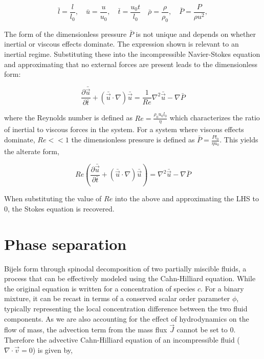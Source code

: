 \begin{equation}
    \bar{l} = \frac{l}{l_0}, \quad \bar{u} = \frac{u}{u_0}, \quad \bar{t} = \frac{u_0 t}{l_0} \quad \bar{\rho} = \frac{\rho}{\rho_0}, \quad \bar{P} = \frac{P}{\rho u^2}, 
\end{equation}

The form of the dimensionless pressure $\bar{P}$ is not unique and depends on whether inertial or viscous effects dominate. The expression shown is 
relevant to an inertial regime. Substituting these into the incompressible Navier-Stokes equation and approximating that no external forces are present 
leads to the dimensionless form:

\begin{equation}
    \frac{\partial \bar{\vec{u}}}{\partial \bar{t}} + (\bar{\vec{u}} \cdot\nabla)\bar{\vec{u}} = \frac{1}{Re} \nabla^2 \bar{\vec{u}} - \nabla\bar{P}
\end{equation}

where the Reynolds number is defined as $Re = \frac{\rho_0 u_0 l_0}{\eta}$ which characterizes the ratio of inertial to viscous forces in the system. For a system
where viscous effects dominate, $Re << 1$ the dimensionless pressure is defined as $\bar{P} = \frac{P l_0}{\eta u_0}$. This yields the alterate form,

\begin{equation}
    Re\left( \frac{\partial \bar{\vec{u}}}{\partial \bar{t}} + (\bar{\vec{u}} \cdot\nabla)\bar{\vec{u}}  \right) = \nabla^2 \bar{\vec{u}} - \nabla\bar{P}
\end{equation}

When substituting the value of $Re$ into the above and approximating the LHS to 0, the Stokes equation is recovered.

\section{Phase separation}

Bijels form through spinodal decomposition of two partially miscible fluids, a process that can be effectively modeled using the Cahn-Hilliard equation. \cite{cahn_spinodal_1961} While the
original equation is written for a concentration of species $c$. For a binary mixture, it can be recast in terms of a conserved scalar order parameter $\phi$, typically representing the 
local concentration difference between the two fluid components. As we are also accounting for the effect of hydrodynamics on the flow of mass, the advection term
from the mass flux $\vec{J}$ cannot be set to 0. Therefore the advective Cahn-Hilliard equation of an incompressible fluid ($\nabla \cdot \vec{v} = 0$) is given by,

